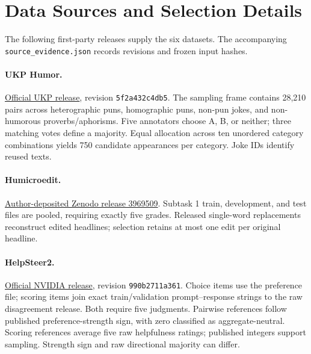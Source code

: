 \section{Data Sources and Selection Details}
\label{app:sources}
The following first-party releases supply the six datasets. The accompanying \texttt{source\_evidence.json} records revisions and frozen input hashes.

\paragraph{UKP Humor.}
\href{https://github.com/UKPLab/acl2019-GPPL-humour-metaphor/tree/5f2a432c4db5191467a3315220b78c926f66f6b3}{Official UKP release}, revision \texttt{5f2a432c4db5}.
The sampling frame contains 28,210 pairs across heterographic puns, homographic puns, non-pun jokes, and non-humorous proverbs/aphorisms. Five annotators choose A, B, or neither; three matching votes define a majority. Equal allocation across ten unordered category combinations yields 750 candidate appearances per category. Joke IDs identify reused texts.

\paragraph{Humicroedit.}
\href{https://zenodo.org/records/3969509}{Author-deposited Zenodo release 3969509}.
Subtask 1 train, development, and test files are pooled, requiring exactly five grades. Released single-word replacements reconstruct edited headlines; selection retains at most one edit per original headline.

\paragraph{HelpSteer2.}
\href{https://huggingface.co/datasets/nvidia/HelpSteer2/tree/990b2711a36180dd19d9c94b8627844866f8982a}{Official NVIDIA release}, revision \texttt{990b2711a361}.
Choice items use the preference file; scoring items join exact train/validation prompt--response strings to the raw disagreement release. Both require five judgments. Pairwise references follow published preference-strength sign, with zero classified as aggregate-neutral. Scoring references average five raw helpfulness ratings; published integers support sampling. Strength sign and raw directional majority can differ.

